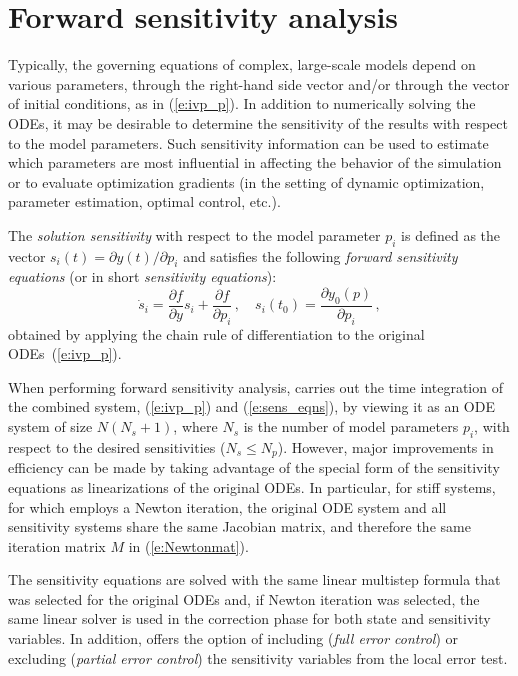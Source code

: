 \section{Forward sensitivity analysis}\label{ss:fwd_sensi}

Typically, the governing equations of complex, large-scale models
depend on various parameters,  through the right-hand side vector 
and/or through the vector of initial conditions, as in (\ref{e:ivp_p}).
In addition to numerically solving the ODEs, it may be desirable to
determine the sensitivity of the results with respect to the model
parameters. 
Such sensitivity information can be used to estimate which
parameters are most influential in affecting the behavior of the
simulation or to evaluate optimization gradients (in the setting of dynamic
optimization, parameter estimation, optimal control, etc.).

The {\em solution sensitivity} with respect to the model parameter
$p_i$ is defined as the vector 
$s_i (t) = {\partial y(t)}/{\partial p_i}$
and satisfies the following {\em forward sensitivity equations}
(or in short {\em sensitivity equations}):
\begin{equation}\label{e:sens_eqns}
{{\dot s}_i}  = \frac{\partial f}{\partial y} s_i + \frac{\partial f}{\partial p_i} \, ,
\quad s_i(t_0)  = \frac{\partial y_{0}(p)}{\partial p_i} \, ,
\end{equation}
obtained by applying the chain rule of differentiation to the original
ODEs~(\ref{e:ivp_p}). 

When performing forward sensitivity analysis, {\cvodes} carries out
the time integration of the combined system, (\ref{e:ivp_p}) and
(\ref{e:sens_eqns}), by viewing it as an ODE system of size
$N(N_s+1)$, where $N_s$ is the number of model parameters $p_i$, with
respect to the desired sensitivities ($N_s \le N_p$).
However, major improvements in efficiency can be made by taking
advantage of the special form of the sensitivity equations as
linearizations of the original ODEs.  In particular, for stiff
systems, for which {\cvodes} employs a Newton iteration, the original
ODE system and all sensitivity systems share the same Jacobian matrix,
and therefore the same iteration matrix $M$ in (\ref{e:Newtonmat}).

The sensitivity equations are solved with the same linear multistep formula that
was selected for the original ODEs and, if Newton iteration was selected, the
same linear solver is used in the correction phase for both state and sensitivity 
variables. In addition, {\cvodes} offers the option of including
({\em full error control}) or excluding
({\em partial error control}) the sensitivity variables from the local 
error test.

